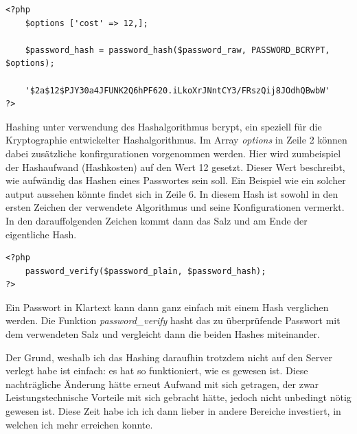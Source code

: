 \documentclass[a4paper,11pt]{report}
\newenvironment{code}{\captionsetup{type=figure}}{}
\begin{document}
\begin{code}
	\begin{center}
		\begin{verbatim}
<?php			
	$options ['cost' => 12,];
				
	$password_hash = password_hash($password_raw, PASSWORD_BCRYPT, $options);
	
	'$2a$12$PJY30a4JFUNK2Q6hPF620.iLkoXrJNntCY3/FRszQij8JOdhQBwbW'
?>
		\end{verbatim}
		\caption{Hashing unter verwendung des Hashalgorithmus bcrypt, ein speziell für die Kryptographie entwickelter Hashalgorithmus. Im Array \emph{options} in Zeile 2 können dabei zusätzliche konfirgurationen vorgenommen werden. Hier wird zumbeispiel der Hashaufwand (Hashkosten) auf den Wert 12 gesetzt. Dieser Wert beschreibt, wie aufwändig das Hashen eines Passwortes sein soll. Ein Beispiel wie ein solcher autput aussehen könnte findet sich in Zeile 6. In diesem Hash ist sowohl in den ersten Zeichen der verwendete Algorithmus und seine Konfigurationen vermerkt. In den darauffolgenden Zeichen kommt dann das Salz und am Ende der eigentliche Hash.}\label{passwordHash:php}
	\end{center}
\end{code}

\begin{code}
	\begin{center}
		\begin{verbatim}
<?php
	password_verify($password_plain, $password_hash);
?>
		\end{verbatim}
	\caption{Ein Passwort in Klartext kann dann ganz einfach mit einem Hash verglichen werden. Die Funktion \emph{password\_verify} hasht das zu überprüfende Passwort mit dem verwendeten Salz und vergleicht dann die beiden Hashes miteinander.}\label{passwordVerify:php}
	\end{center}
\end{code}

					
		Der Grund, weshalb ich das Hashing daraufhin trotzdem nicht auf den Server verlegt habe ist einfach: es hat so funktioniert, wie es gewesen ist. Diese nachträgliche Änderung hätte erneut Aufwand mit sich getragen, der zwar Leistungstechnische Vorteile mit sich gebracht hätte, jedoch nicht unbedingt nötig gewesen ist. Diese Zeit habe ich  ich dann lieber in andere Bereiche investiert, in welchen ich mehr erreichen konnte.
		
		
\end{document}
